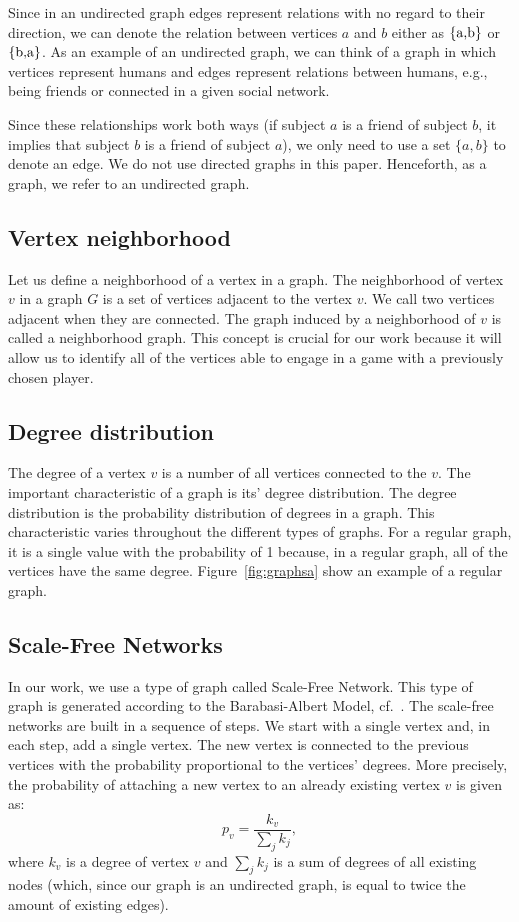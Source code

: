 \documentclass[english, twoside, 12pt, a4paper]{article}
\theoremstyle{definition}
\theoremstyle{plain}
\theoremstyle{remark}
\begin{document}
Since in an undirected graph edges represent relations with no regard to their direction, we can denote the relation between vertices $a$ and $b$ either as \(\{$a,b$\}\) or \(\{$b,a$\}\). As an example of an undirected graph, we can think of a graph in which vertices represent humans and edges represent relations between humans, e.g., being friends or connected in a given social network. 

Since these relationships work both ways (if subject \( a\) is a friend of subject \( b\), it implies that subject \(b\) is a friend of subject \(a\)), we only need to use a set \(\{a, b\}\) to denote an edge. We do not use directed graphs in this paper. Henceforth, as a graph, we refer to an undirected graph. 

\subsection{Vertex neighborhood}

Let us define a neighborhood of a vertex in a graph. The neighborhood of vertex $v$ in a graph $G$ is a set of vertices adjacent to the vertex $v$. We call two vertices adjacent when they are connected. The graph induced by a neighborhood of \( v \) is called a neighborhood graph. This concept is crucial for our work because it will allow us to identify all of the vertices able to engage in a game with a previously chosen player. 

\subsection{Degree distribution}

The degree of a vertex $v$ is a number of all vertices connected to the $v$. The important characteristic of a graph is its' degree distribution. The degree distribution is the probability distribution of degrees in a graph. This characteristic varies throughout the different types of graphs. For a regular graph, it is a single value with the probability of 1 because, in a regular graph, all of the vertices have the same degree. Figure~\ref{fig:graphsa} show an example of a regular graph. 

\subsection{Scale-Free Networks}

In our work, we use a type of graph called Scale-Free Network. This type of graph is generated according to the Barabasi-Albert Model, cf.~\cite{albert2002statistical}. The scale-free networks are built in a sequence of steps. We start with a single vertex and, in each step, add a single vertex. The new vertex is connected to the previous vertices with the probability proportional to the vertices' degrees. More precisely, the probability of attaching a new vertex to an already existing vertex \(v\) is given as:
\[ 
p_v = \frac{k_v}{\sum_{j} k_j},
\]
where $k_v$ is a degree of vertex $v$ and $\sum_{j} k_j$ is a sum of degrees of all existing nodes (which, since our graph is an undirected graph, is equal to twice the amount of existing edges). 
\end{document}

